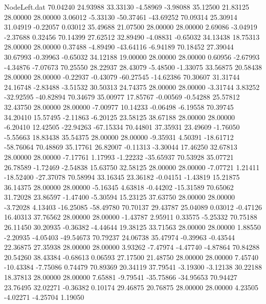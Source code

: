 \begin{filecontents}{NodeLeft.dat}
  70.04240   24.93988   33.33130    -4.58969   -3.98088   35.12500   21.83125   28.00000   28.00000    3.06012   -5.33130  -50.37461  -43.69252
  70.09314   25.30914   31.04919    -0.22057    0.03012   35.49688   21.07500   28.00000   28.00000    2.69086   -3.04919   -2.37688    0.32456
  70.14399   27.62512   32.89490    -4.08831   -0.65032   34.13438   18.75313   28.00000   28.00000    0.37488   -4.89490  -43.64116   -6.94189
  70.18452   27.39044   30.67993    -0.39963   -0.65032   34.12188   19.00000   28.00000   28.00000    0.60956   -2.67993   -4.34876   -7.07673
  70.25550   28.22937   28.43079    -5.48500   -1.33075   33.56875   20.58438   28.00000   28.00000   -0.22937   -0.43079  -60.27545  -14.62386
  70.30607   31.31744   24.16748    -2.83488   -3.51532   30.50313   24.74375   28.00000   28.00000   -3.31744    3.83252  -32.92595  -40.82894
  70.34679   35.00977   17.85767    -0.00569   -0.54288   25.57812   32.43750   28.00000   28.00000   -7.00977   10.14233   -0.06498   -6.19558
  70.39745   34.20410   15.57495    -2.11863   -6.20125   23.58125   38.67188   28.00000   28.00000   -6.20410   12.42505  -22.94263  -67.15334
  70.44801   37.35931   23.49609    -1.76050   -5.55663   18.83438   35.54375   28.00000   28.00000   -9.35931    4.50391  -18.61712  -58.76064
  70.48869   35.17761   26.82007    -0.11313   -3.30044   17.46250   32.67813   28.00000   28.00000   -7.17761    1.17993   -1.22232  -35.65937
  70.53928   35.07721   26.78589    -1.72469   -2.54838   15.63750   32.58125   28.00000   28.00000   -7.07721    1.21411  -18.52400  -27.37078
  70.58994   33.16345   23.36182    -0.04151   -1.43819   15.21875   36.14375   28.00000   28.00000   -5.16345    4.63818   -0.44202  -15.31589
  70.65062   31.72028   23.86597    -1.47400   -5.30594   15.23125   37.63750   28.00000   28.00000   -3.72028    4.13403  -16.25085  -58.49780
  70.70137   29.43787   25.04089     0.03012   -0.47126   16.40313   37.76562   28.00000   28.00000   -1.43787    2.95911    0.33575   -5.25332
  70.75188   26.11450   30.20935    -0.36382   -4.44644   19.38125   33.71563   28.00000   28.00000    1.88550   -2.20935   -4.05403  -49.54673
  70.79237   24.06738   35.47974    -0.39963   -0.43544   22.36875   27.35938   28.00000   28.00000    3.93262   -7.47974   -4.47740   -4.87864
  70.84288   20.54260   38.43384    -0.68613    0.06593   27.17500   21.48750   28.00000   28.00000    7.45740  -10.43384   -7.75086    0.74479
  70.89369   20.34119   37.79541    -3.19300   -3.12138   30.22188   18.37813   28.00000   28.00000    7.65881   -9.79541  -35.75866  -34.95653
  70.94427   23.76495   32.02271    -0.36382    0.10174   29.46875   20.76875   28.00000   28.00000    4.23505   -4.02271   -4.25704    1.19050

\end{filecontents}
